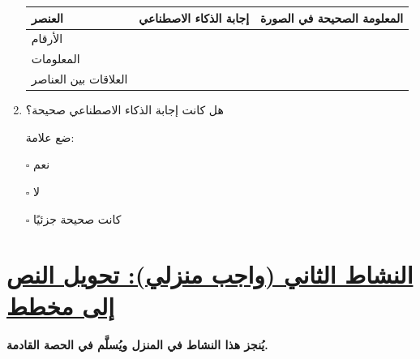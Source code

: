\documentclass[a4paper]{article}
\begin{document}
\begin{enumerate}
\begin{center}
\begin{tabular}{|
>{\centering\arraybackslash}m{4cm}|
>{\centering\arraybackslash}m{5cm}|
>{\centering\arraybackslash}m{5cm}|}
\textbf{العنصر}
&
\textbf{إجابة الذكاء الاصطناعي}
&
\textbf{المعلومة الصحيحة في الصورة}
\\

\hline

الأرقام
&
&
\\[0.7cm]

\hline

المعلومات
&
&
\\[0.7cm]

\hline

العلاقات بين العناصر
&
&
\\[0.7cm]

\hline

\end{tabular}

\end{center}


\item هل كانت إجابة الذكاء الاصطناعي صحيحة؟

ضع علامة:

\begin{center}

$\square$ نعم

\hspace{2cm}

$\square$ لا

\hspace{2cm}

$\square$ كانت صحيحة جزئيًا

\end{center}



\end{enumerate}



\section*{\khatt\underline{النشاط الثاني (واجب منزلي): تحويل النص إلى مخطط}}

\textbf{يُنجز هذا النشاط في المنزل ويُسلَّم في الحصة القادمة.}
\end{document}
